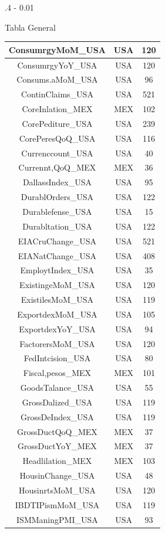 \documentclass{iteraposter}\usepackage[]{graphicx}\usepackage[]{color}
\begin{document}
\begin{frame}
\begin{columns}[onlytextwidth]
\begin{column}{.4 \textwidth - 0.01\textwidth}
\begin{block}{Tabla General}
\begin{tabular}{c|c|c}
\hline
ConsumrgyMoM\_USA & USA & 120\\
\hline
ConsumrgyYoY\_USA & USA & 120\\
\hline
Consums.aMoM\_USA & USA & 96\\
\hline
ContinClaims\_USA & USA & 521\\
\hline
CoreInlation\_MEX & MEX & 102\\
\hline
CorePediture\_USA & USA & 239\\
\hline
CorePeresQoQ\_USA & USA & 116\\
\hline
Currenccount\_USA & USA & 40\\
\hline
Currennt,QoQ\_MEX & MEX & 36\\
\hline
DallassIndex\_USA & USA & 95\\
\hline
DurablOrders\_USA & USA & 122\\
\hline
Durablefense\_USA & USA & 15\\
\hline
Durabltation\_USA & USA & 122\\
\hline
EIACruChange\_USA & USA & 521\\
\hline
EIANatChange\_USA & USA & 408\\
\hline
EmploytIndex\_USA & USA & 35\\
\hline
ExistingeMoM\_USA & USA & 120\\
\hline
ExistilesMoM\_USA & USA & 119\\
\hline
ExportdexMoM\_USA & USA & 105\\
\hline
ExportdexYoY\_USA & USA & 94\\
\hline
FactorersMoM\_USA & USA & 120\\
\hline
FedIntcision\_USA & USA & 80\\
\hline
Fiscal,pesos\_MEX & MEX & 101\\
\hline
GoodsTalance\_USA & USA & 55\\
\hline
GrossDalized\_USA & USA & 119\\
\hline
GrossDeIndex\_USA & USA & 119\\
\hline
GrossDuctQoQ\_MEX & MEX & 37\\
\hline
GrossDuctYoY\_MEX & MEX & 37\\
\hline
Headlilation\_MEX & MEX & 103\\
\hline
HousinChange\_USA & USA & 48\\
\hline
HousinrtsMoM\_USA & USA & 120\\
\hline
IBDTIPismMoM\_USA & USA & 119\\
\hline
ISMManingPMI\_USA & USA & 93\\
\hline

\end{tabular}
\end{block}
\end{column}
\end{columns}
\end{frame}
\end{document}
